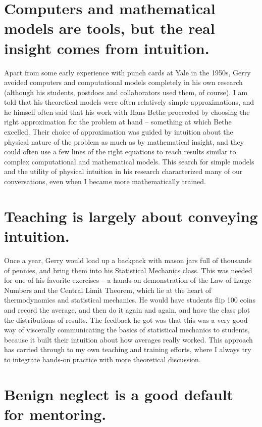 \section*{Computers and mathematical models are tools, but the real insight
comes from intuition.}

Apart from some early experience with punch cards at Yale in the
1950s, Gerry avoided computers and computational models completely in
his own research (although his students, postdocs and collaborators
used them, of course). I am told that his theoretical models were
often relatively simple approximations, and he himself often said that
his work with Hans Bethe proceeded by choosing the right approximation
for the problem at hand -- something at which Bethe excelled. Their
choice of approximation was guided by intuition about the physical
nature of the problem as much as by mathematical insight, and they
could often use a few lines of the right equations to reach results
similar to complex computational and mathematical models. This search
for simple models and the utility of physical intuition in his
research characterized many of our conversations, even when I became
more mathematically trained.

\section*{Teaching is largely about conveying intuition.}

Once a year, Gerry would load up a backpack with mason jars full of
thousands of pennies, and bring them into his Statistical Mechanics
class. This was needed for one of his favorite exercises -- a hands-on
demonstration of the Law of Large Numbers and the Central Limit
Theorem, which lie at the heart of thermodynamics and statistical
mechanics. He would have students flip 100 coins and record the
average, and then do it again and again, and have the class plot the
distributions of results. The feedback he got was that this was a very
good way of viscerally communicating the basics of statistical
mechanics to students, because it built their intuition about how
averages really worked. This approach has carried through to my own
teaching and training efforts, where I always try to integrate
hands-on practice with more theoretical discussion.

\section*{Benign neglect is a good default for mentoring.}

